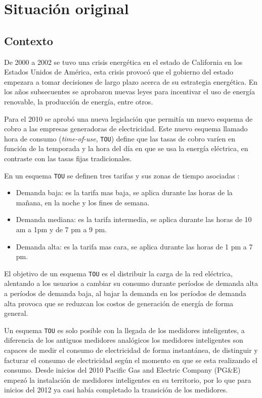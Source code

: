 \chapter{Situación original}

\section{Contexto}
De 2000 a 2002 se tuvo una crisis energética en el estado de California en los
Estados Unidos de América, esta crisis provocó que el gobierno del estado empezara a
tomar decisiones de largo plazo acerca de su estrategia energética. En los años
subsecuentes se aprobaron nuevas leyes para incentivar el uso de energía renovable,
la producción de energía, entre otros.

Para el 2010 se aprobó una nueva legislación que permitía un nuevo esquema
de cobro a las empresas generadoras de electricidad. Este nuevo esquema
llamado hora de consumo (\textit{time-of-use}, \texttt{TOU}) define que las
tasas de cobro varíen en función de la temporada y la hora del día en que
se usa la energía eléctrica, en contraste con las tasas fijas tradicionales.

\vspace{2.5mm}

En un esquema \texttt{TOU} se definen tres tarifas y sus zonas de tiempo asociadas
\cite{16_pge_time_of_use_2015}:

\begin{itemize}
\item  Demanda baja: es la tarifa mas baja, se aplica durante las horas de la
  mañana, en la noche y los fines de semana.
\item Demanda mediana: es la tarifa intermedia, se aplica durante las horas de
  10 am a 1pm y de 7 pm a 9 pm.
\item Demanda alta: es la tarifa mas cara, se aplica durante las horas de
  1 pm a 7 pm.
\end{itemize}

El objetivo de un esquema \texttt{TOU} es el distribuir la carga de la red
eléctrica, alentando a los usuarios a cambiar su consumo durante períodos
de demanda alta a períodos de demanda baja, al bajar la demanda en los períodos
de demanda alta provoca que se reduzcan los costos de generación de energía de
forma general.

Un esquema \texttt{TOU} es solo posible con la llegada de los medidores
inteligentes, a diferencia de los antiguos medidores analógicos los medidores
inteligentes son capaces de medir el consumo de electricidad de forma instantánea,
de distinguir y facturar el consumo de electricidad según el momento en que se
esta realizando el consumo. Desde inicios del 2010 Pacific Gas and
Electric Company (PG\&E) empezó la instalación de medidores inteligentes
en su territorio, por lo que para inicios del 2012 ya casi había
completado la transición de los medidores.

